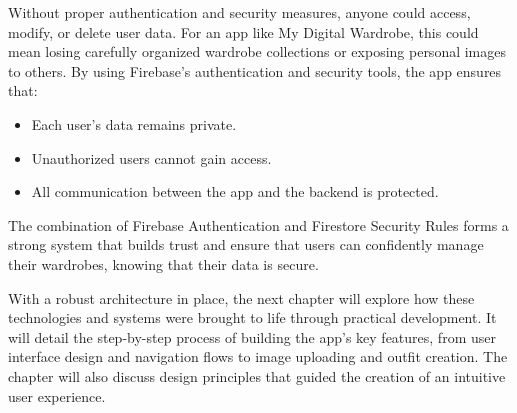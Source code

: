 Without proper authentication and security measures, anyone could access, modify, or delete user data. For an app like My Digital Wardrobe, this could mean losing carefully organized wardrobe collections or exposing personal images to others. By using Firebase's authentication and security tools, the app ensures that:
\begin{itemize}
    \item Each user’s data remains private.
    \item Unauthorized users cannot gain access.
    \item All communication between the app and the backend is protected.
\end{itemize}
The combination of Firebase Authentication and Firestore Security Rules forms a strong system that builds trust and ensure that users can confidently manage their wardrobes, knowing that their data is secure.

With a robust architecture in place, the next chapter will explore how these technologies and systems were brought to life through practical development. It will detail the step-by-step process of building the app’s key features, from user interface design and navigation flows to image uploading and outfit creation. The chapter will also discuss design principles that guided the creation of an intuitive user experience.